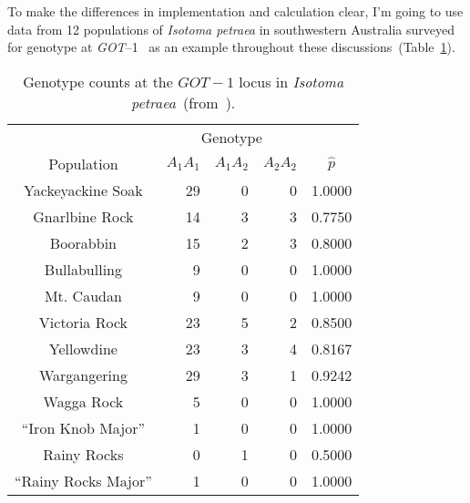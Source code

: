 \documentclass[12pt]{article}
\begin{document}
To make the differences in implementation and calculation clear, I'm
going to use data from 12 populations of {\it Isotoma petraea\/} in
southwestern Australia surveyed for genotype at {\it
  GOT\/}--1~\cite{James-etal-1983} as an example throughout these
discussions~(Table~\ref{table:isotoma}).
\begin{table}
\begin{center}
\begin{tabular}{c|rrr|c}
\hline\hline
           & \multicolumn{3}{c|}{Genotype} & \\
Population & $A_{1}A_{1}$ & $A_{1}A_{2}$ & $A_{2}A_{2}$ & $\hat p$ \\
\hline
Yackeyackine Soak     & 29 & 0 & 0 & 1.0000 \\
Gnarlbine Rock        & 14 & 3 & 3 & 0.7750 \\
Boorabbin             & 15 & 2 & 3 & 0.8000 \\
Bullabulling          & 9  & 0 & 0 & 1.0000 \\
Mt. Caudan            & 9  & 0 & 0 & 1.0000 \\
Victoria Rock         & 23 & 5 & 2 & 0.8500 \\
Yellowdine            & 23 & 3 & 4 & 0.8167 \\
Wargangering          & 29 & 3 & 1 & 0.9242 \\
Wagga Rock            & 5  & 0 & 0 & 1.0000 \\
``Iron Knob Major''   & 1  & 0 & 0 & 1.0000 \\
Rainy Rocks           & 0  & 1 & 0 & 0.5000 \\
``Rainy Rocks Major'' & 1  & 0 & 0 & 1.0000 \\
\hline
\end{tabular}
\end{center}
\caption{Genotype counts at the $GOT-1$ locus in {\it Isotoma
    petraea}~(from~\cite{James-etal-1983}).}\label{table:isotoma}
\end{table}
\end{document}
